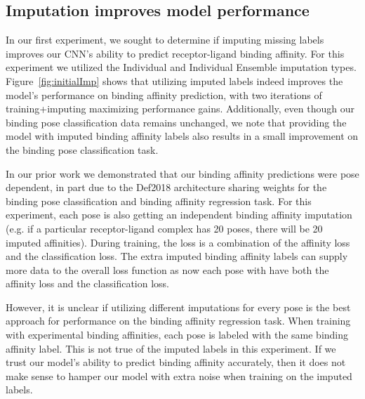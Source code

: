 \documentclass[journal=jcim,manuscript=article]{achemso}
\begin{document}
\subsection{Imputation improves model performance}
In our first experiment, we sought to determine if imputing missing labels improves our CNN's ability to predict receptor-ligand binding affinity.
For this experiment we utilized the Individual and Individual Ensemble imputation types.
Figure~\ref{fig:initialImp} shows that utilizing imputed labels indeed improves the model's performance on binding affinity prediction, with two iterations of training+imputing maximizing performance gains.
Additionally, even though our binding pose classification data remains unchanged, we note that providing the model with imputed binding affinity labels also results in a small improvement on the binding pose classification task.

In our prior work we demonstrated that our binding affinity predictions were pose dependent, in part due to the Def2018 architecture sharing weights for the binding pose classification and binding affinity regression task\cite{crossdocked2020}.
For this experiment, each pose is also getting an independent binding affinity imputation (e.g. if a particular receptor-ligand complex has 20 poses, there will be 20 imputed affinities).
During training, the loss is a combination of the affinity loss and the classification loss.
The extra imputed binding affinity labels can supply more data to the overall loss function as now each pose with have both the affinity loss and the classification loss.

However, it is unclear if utilizing different imputations for every pose is the best approach for performance on the binding affinity regression task.
When training with experimental binding affinities, each pose is labeled with the same binding affinity label.
This is not true of the imputed labels in this experiment.
If we trust our model's ability to predict binding affinity accurately, then it does not make sense to hamper our model with extra noise when training on the imputed labels.
\end{document}
